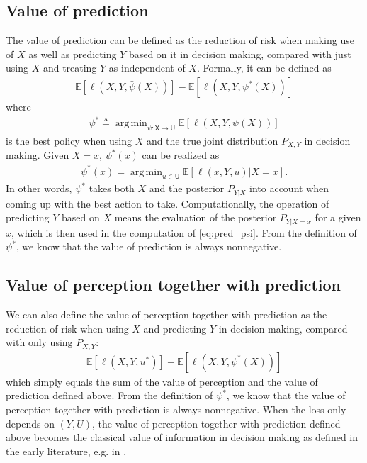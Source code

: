 \documentclass{article}
\newcommand{\E}{\mathbb{E}}
\DeclareMathOperator*{\argmin}{arg\,min}
\def\sU{{\mathsf U}}
\def\sX{{\mathsf X}}
\def\deq{\triangleq}
\begin{document}
\subsection{ Value of prediction}
The value of prediction can be defined as the reduction of risk when making use of $X$ as well as predicting $Y$ based on it in decision making, compared with just using $X$ and treating $Y$ as independent of $X$. Formally, it can be defined as
\begin{align}\label{eq:vopred_def}
 \E[\ell(X,Y,\bar\psi(X))] - \E[\ell(X,Y,\psi^*(X))]
	\end{align}
    where
\begin{align}\label{eq:psi*_def}
\psi^*\deq\argmin_{\psi:\sX\rightarrow\sU} \E[\ell(X, Y,\psi(X))]
   \end{align}
is the best policy when using $X$ and the true joint distribution $P_{X,Y}$ in decision making.
Given $X=x$, $\psi^*(x)$ can be realized as 
\begin{align}
\psi^*(x) = \argmin_{u\in\sU}\E[\ell(x,Y,u)|X=x] . \label{eq:pred_psi}
\end{align}
In other words, $\psi^*$ takes both $X$ and the posterior $P_{Y|X}$ into account when coming up with the best action to take.
Computationally, the operation of predicting $Y$ based on $X$ means the evaluation of the posterior $P_{Y|X=x}$ for a given $x$, which is then used in the computation of \eqref{eq:pred_psi}.
From the definition of $\psi^*$, we know that the value of prediction is always nonnegative.

\subsection{Value of perception together with prediction}
We can also define the value of perception together with prediction as the reduction of risk when using $X$ and predicting $Y$ in decision making, compared with only using $P_{X,Y}$:
\begin{align}\label{eq:vo_percep_pred_def}
 \E[\ell(X,Y,u^*)] - \E[\ell(X,Y,\psi^*(X))]
	\end{align}
which simply equals the sum of the value of perception and the value of prediction defined above.
From the definition of $\psi^*$, we know that the value of perception together with prediction is always nonnegative.
When the loss only depends on $(Y,U)$, the value of perception together with prediction defined above becomes the classical value of information in decision making as defined in the early literature, e.g. in \cite{DeGroot62}
.  
\end{document}
